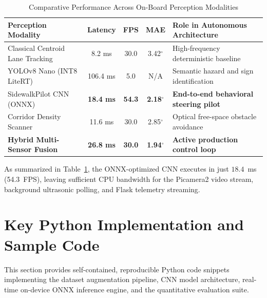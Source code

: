 \documentclass[a4paper,11pt]{article}
\begin{document}
\begin{table}[H]
\centering
\caption{Comparative Performance Across On-Board Perception Modalities}
\label{tab:modalities_comp}
\begin{tabularx}{\textwidth}{|l|c|c|c|X|}
\hline
\textbf{Perception Modality} & \textbf{Latency} & \textbf{FPS} & \textbf{MAE} & \textbf{Role in Autonomous Architecture} \\
\hline
Classical Centroid Lane Tracking & 8.2 ms & 30.0 & 3.42$^\circ$ & High-frequency deterministic baseline \\
YOLOv8 Nano (INT8 LiteRT) & 106.4 ms & 5.0 & N/A & Semantic hazard and sign identification \\
SidewalkPilot CNN (ONNX) & \textbf{18.4 ms} & \textbf{54.3} & \textbf{2.18$^\circ$} & \textbf{End-to-end behavioral steering pilot} \\
Corridor Density Scanner & 11.6 ms & 30.0 & 2.85$^\circ$ & Optical free-space obstacle avoidance \\
\textbf{Hybrid Multi-Sensor Fusion} & \textbf{26.8 ms} & \textbf{30.0} & \textbf{1.94$^\circ$} & \textbf{Active production control loop} \\
\hline
\end{tabularx}
\end{table}

As summarized in Table~\ref{tab:modalities_comp}, the ONNX-optimized CNN executes in just $18.4$~ms (54.3~FPS), leaving sufficient CPU bandwidth for the Picamera2 video stream, background ultrasonic polling, and Flask telemetry streaming.

\newpage
\section{Key Python Implementation and Sample Code}
This section provides self-contained, reproducible Python code snippets implementing the dataset augmentation pipeline, CNN model architecture, real-time on-device ONNX inference engine, and the quantitative evaluation suite.
\end{document}
